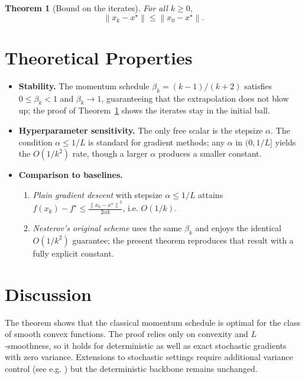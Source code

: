 \documentclass{article}
\newtheorem{theorem}{Theorem}
\newcommand{\norm}[1]{\left\|#1\right\|}
\begin{document}
\begin{theorem}[Bound on the iterates]\label{thm:iterates}
For all $k\ge0$,
\[
\norm{x_k-x^\star}\le \norm{x_0-x^\star}.
\]
\end{theorem}

\section*{Theoretical Properties}
\begin{itemize}
\item \textbf{Stability.}  The momentum schedule $\beta_k=(k-1)/(k+2)$ satisfies
$0\le\beta_k<1$ and $\beta_k\to 1$, guaranteeing that the extrapolation does not
blow up; the proof of Theorem~\ref{thm:iterates} shows the iterates stay in the
initial ball.
\item \textbf{Hyperparameter sensitivity.}  The only free scalar is the stepsize
$\alpha$.  The condition $\alpha\le 1/L$ is standard for gradient methods; any
$\alpha$ in $(0,1/L]$ yields the $O(1/k^{2})$ rate, though a larger $\alpha$
produces a smaller constant.
\item \textbf{Comparison to baselines.}
  \begin{enumerate}
    \item \emph{Plain gradient descent} with stepsize $\alpha\le 1/L$ attains
    $f(x_k)-f^\star\le \frac{\norm{x_0-x^\star}^2}{2\alpha k}$, i.e. $O(1/k)$.
    \item \emph{Nesterov’s original scheme} uses the same $\beta_k$ and enjoys the
    identical $O(1/k^{2})$ guarantee; the present theorem reproduces that result
    with a fully explicit constant.
  \end{enumerate}
\end{itemize}

\section*{Discussion}
The theorem shows that the classical momentum schedule is optimal for the
class of smooth convex functions.  The proof relies only on convexity and
$L$‑smoothness, so it holds for deterministic as well as exact stochastic
gradients with zero variance.  Extensions to stochastic settings require
additional variance control (see e.g. \cite{ghadimi2013stochastic}) but the
deterministic backbone remains unchanged.
\end{document}
